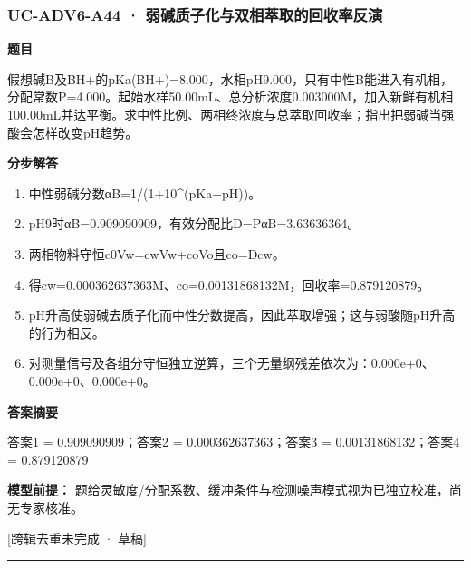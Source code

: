 \documentclass[UTF8,11pt,a4paper]{ctexart}
\begin{document}
\subsubsection*{UC-ADV6-A44 · 弱碱质子化与双相萃取的回收率反演}
\noindent\textbf{题目}\par
假想碱B及BH+的pKa(BH+)=8.000，水相pH9.000，只有中性B能进入有机相，分配常数P=4.000。起始水样50.00mL、总分析浓度0.003000M，加入新鲜有机相100.00mL并达平衡。求中性比例、两相终浓度与总萃取回收率；指出把弱碱当强酸会怎样改变pH趋势。\par
\medskip\noindent\textbf{分步解答}
\begin{enumerate}
\item 中性弱碱分数αB=1/(1+10\textasciicircum{}(pKa−pH))。
\item pH9时αB=0.909090909，有效分配比D=PαB=3.63636364。
\item 两相物料守恒c0Vw=cwVw+coVo且co=Dcw。
\item 得cw=0.000362637363M、co=0.00131868132M，回收率=0.879120879。
\item pH升高使弱碱去质子化而中性分数提高，因此萃取增强；这与弱酸随pH升高的行为相反。
\item 对测量信号及各组分守恒独立逆算，三个无量纲残差依次为：0.000e+0、0.000e+0、0.000e+0。
\end{enumerate}
\noindent\textbf{答案摘要}\par
答案1 = 0.909090909；答案2 = 0.000362637363；答案3 = 0.00131868132；答案4 = 0.879120879\par
\noindent\textbf{模型前提：}
题给灵敏度/分配系数、缓冲条件与检测噪声模式视为已独立校准，尚无专家核准。\par
\noindent\textcolor{red!65!black}{[跨辑去重未完成 · 草稿]} \par
\medskip\hrule\medskip
{}
\end{document}
